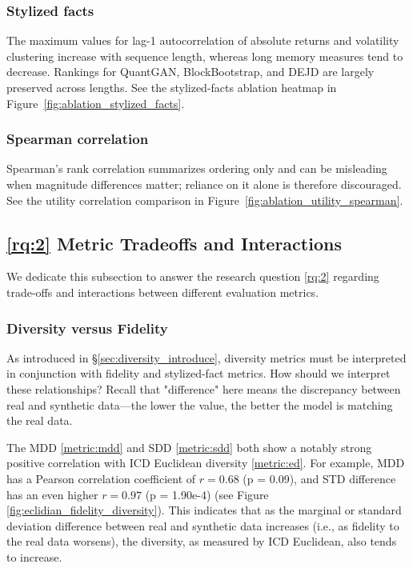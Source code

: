 \subsubsection{Stylized facts}
  The maximum values for lag-1 autocorrelation of absolute returns and
  volatility clustering increase with sequence length, whereas long
  memory measures tend to decrease. Rankings for QuantGAN,
  BlockBootstrap, and DEJD are largely preserved across lengths. See
  the stylized-facts ablation heatmap in
  Figure~\ref{fig:ablation_stylized_facts}.

\subsubsection{Spearman correlation}
  Spearman's rank correlation summarizes ordering only and can be
  misleading when magnitude differences matter; reliance on it alone is
  therefore discouraged. See the utility correlation comparison in
  Figure~\ref{fig:ablation_utility_spearman}.


  \subsection{\ref{rq:2} Metric Tradeoffs and Interactions}
  \label{sec:metric_tradeoffs}
    We dedicate this subsection to answer the research question
    \ref{rq:2} regarding trade-offs and interactions between different
    evaluation metrics.

    \subsubsection{Diversity versus Fidelity}
      As introduced in §\ref{sec:diversity_introduce}, diversity
      metrics must be interpreted in conjunction with fidelity and
      stylized-fact metrics. How should we interpret these relationships? 
      Recall that "difference" here means the discrepancy between real 
      and synthetic data—the lower the value, the better the model is 
      matching the real data.

      The MDD \ref{metric:mdd} and SDD \ref{metric:sdd} 
      both show a notably strong positive correlation with ICD 
      Euclidean diversity \ref{metric:ed}. For example, MDD has a 
      Pearson correlation coefficient of \( r = 0.68 \) (p = 0.09), 
      and STD difference has an even higher \( r = 0.97 \) 
      (p = 1.90e-4) (see Figure \ref{fig:eclidian_fidelity_diversity}). 
      This indicates that as the marginal or standard deviation 
      difference between real and synthetic data increases (i.e., as 
      fidelity to the real data worsens), the diversity, as measured 
      by ICD Euclidean, also tends to increase.

